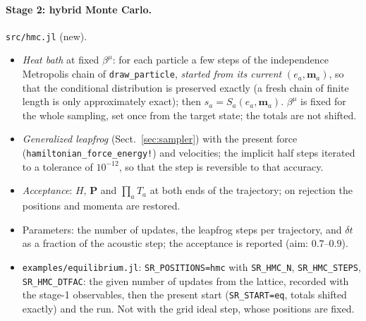 \documentclass[11pt,aps,preprint,nofootinbib,superscriptaddress,tightenlines]{revtex4-2}
\def\Sect#1{Sect.~\ref{#1}}
\let\oldparagraph\paragraph
\renewcommand{\paragraph}{\par\bigskip\oldparagraph}
\begin{document}
\medskip


\paragraph{Stage 2: hybrid Monte Carlo.}  \texttt{src/hmc.jl} (new).
\begin{itemize}
\item \emph{Heat bath} at fixed $\beta^\mu$: for each particle a few steps of the independence Metropolis chain of
  \texttt{draw\_particle}, \emph{started from its current} $(e_a,\bm m_a)$, so that the conditional distribution is preserved
  exactly (a fresh chain of finite length is only approximately exact); then $s_a=S_a(e_a,\bm m_a)$.  $\beta^\mu$ is fixed for the
  whole sampling, set once from the target state; the totals are not shifted.
\item \emph{Generalized leapfrog} (\Sect{sec:sampler}) with the present force (\texttt{hamiltonian\_force\_energy!}) and velocities;
  the implicit half steps iterated to a tolerance of $10^{-12}$, so that the step is reversible to that accuracy.
\item \emph{Acceptance}: $H$, $\bm P$ and $\prod_aT_a$ at both ends of the trajectory; on rejection the positions and momenta are
  restored.
\item Parameters: the number of updates, the leapfrog steps per trajectory, and $\delta t$ as a fraction of the acoustic step;
  the acceptance is reported (aim: $0.7$--$0.9$).
\item \texttt{examples/equilibrium.jl}: \texttt{SR\_POSITIONS=hmc} with \texttt{SR\_HMC\_N}, \texttt{SR\_HMC\_STEPS}, \\
  \texttt{SR\_HMC\_DTFAC}: the given number of updates from the lattice, recorded with the stage-1 observables, then the present
  start (\texttt{SR\_START=eq}, totals shifted exactly) and the run.  Not with the grid ideal step, whose positions are fixed.
\end{itemize}
\medskip
\end{document}
